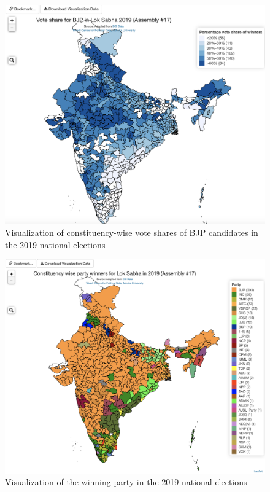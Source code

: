  \begin{figure}
 \centering
 \includegraphics[width=\linewidth]{BJPVoteshare2019}
 \caption{Visualization of constituency-wise vote shares of BJP candidates in the 2019 national elections}
 \label{BJPVS}
 \end{figure}
 
 \begin{figure}
 \centering
 \includegraphics[width=\linewidth]{PartyWinnersMap2019}
 \caption{Visualization of the winning party in the 2019 national elections }
 \label{partyWn}
 \end{figure}
 
